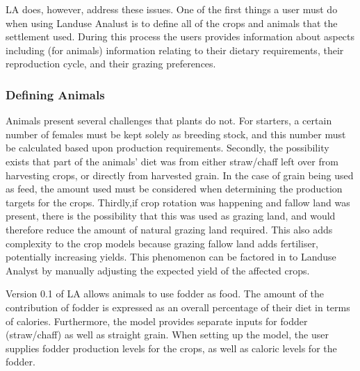     LA does, however, address these issues.  One of the first things a user must
    do when using Landuse Analust is to define all of the crops and animals that
    the settlement used.  During this process the users provides information
    about aspects including (for animals) information
    relating to their dietary requirements, their reproduction cycle, and their
    grazing preferences.

    \subsubsection{Defining Animals}
    \label{definingAnimals}
      Animals present several challenges that plants do not.  For starters, a
      certain number of females must be kept solely as breeding stock, and this
      number must be calculated based upon production requirements.  Secondly,
      the possibility exists that part of the animals' diet was from either
      straw/chaff left over from harvesting crops, or directly from harvested
      grain.  In the case of grain being used as feed, the amount used must be
      considered when determining the production targets for the crops. 
      Thirdly,if crop rotation was happening and fallow land was present, there
      is the possibility that this was used as grazing land, and would therefore
      reduce the amount of natural grazing land required.  This also adds
      complexity to the crop models because grazing fallow land adds fertiliser,
      potentially increasing yields.  This phenomenon can be factored in to
      Landuse Analyst by manually adjusting the expected yield of the affected
      crops.
      
      Version 0.1 of LA allows animals to use fodder as food.  The amount of the
      contribution of fodder is expressed as an overall percentage of their diet
      in terms of calories.  Furthermore, the model provides separate inputs for
      fodder (straw/chaff) as well as straight grain.  When setting up the
      model, the user supplies fodder production levels for the crops, as well as
      caloric levels for the fodder.

